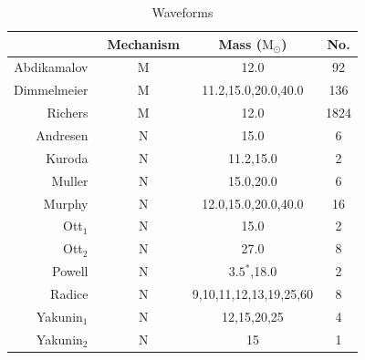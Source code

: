 \documentclass[aps,twocolumn,showpacs,groupedaddress, nofootinbib]{revtex4}  %
\begin{document}
%
%
\begin{table}[]
\centering
\begin{threeparttable}
\caption{Waveforms}
\label{table:waveforms}
\begin{tabular}{rccc}
\toprule
    & Mechanism         & Mass ($\text{M}_\odot$)                         & No.  \\
\hline                         
Abdikamalov~\cite{abdikamalov2014measuring} & M   & 12.0                          & 92   \\
Dimmelmeier~\cite{dimmelmeier2008gravitational} & M   & 11.2,15.0,20.0,40.0        & 136  \\
Richers~\cite{richers2017equation}     & M   & 12.0                          & 1824 \\
Andresen~\cite{10.1093mnrasstz990}    & N   & 15.0                          & 6    \\
Kuroda~\cite{kuroda2017correlated}      & N   & 11.2,15.0                    & 2    \\
Muller~\cite{muller2012parametrized}      & N   & 15.0,20.0                    & 6    \\
Murphy~\cite{murphy2009model}      & N   & 12.0,15.0,20.0,40.0        & 16   \\
Ott$_1$~\cite{ott2009gravitational}       & N   & 15.0                          & 2    \\
Ott$_2$~\cite{ott2013general}       & N   & 27.0                          & 8    \\
Powell~\cite{powell2019gravitational}      & N   & $3.5^{*}$,18.0                      & 2    \\
Radice~\cite{radice2019characterizing}      & N   & 9,10,11,12,13,19,25,60 & 8    \\
Yakunin$_1$~\cite{yakunin2015gravitational}   & N   & 12,15,20,25                & 4    \\
Yakunin$_2$~\cite{yakunin2017gravitational}   & N   & 15                            & 1   \\
\hline
\hline
\end{tabular}
\begin{tablenotes}
\setlength{}
\end{tablenotes}
\end{threeparttable} 
\end{table}
\end{document}

